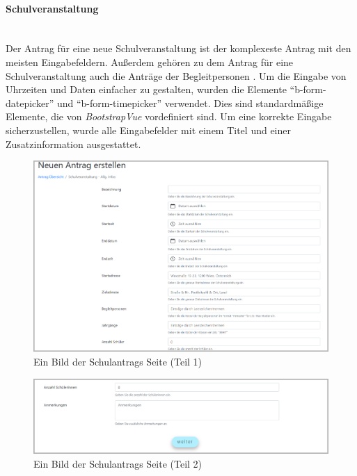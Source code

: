 \paragraph{Schulveranstaltung}
~\\
Der Antrag für eine neue Schulveranstaltung ist der komplexeste Antrag mit den meisten Eingabefeldern. Außerdem gehören zu dem Antrag für eine Schulveranstaltung auch die Anträge der Begleitpersonen . Um die Eingabe von Uhrzeiten und Daten einfacher zu gestalten, wurden die Elemente \enquote{b-form-datepicker} und \enquote{b-form-timepicker} verwendet. Dies sind standardmäßige Elemente, die von \textit{BootstrapVue} vordefiniert sind. Um eine korrekte Eingabe sicherzustellen, wurde alle Eingabefelder mit einem Titel und einer Zusatzinformation ausgestattet.
\begin{figure}[H]
	\centering
	\includegraphics[width=1\linewidth]{images/ldehner_implementierung/schul_1}
	\caption[Neuer Schulantrag Seite (Teil 1)]{Ein Bild der Schulantrags Seite (Teil 1)}
	\label{fig:schulantrag1}
\end{figure}
\begin{figure}[H]
	\centering
	\includegraphics[width=1\linewidth]{images/ldehner_implementierung/schul_2}
	\caption[Neuer Schulantrag Seite (Teil 2)]{Ein Bild der Schulantrags Seite (Teil 2)}
	\label{fig:schulantrag2}
\end{figure}
